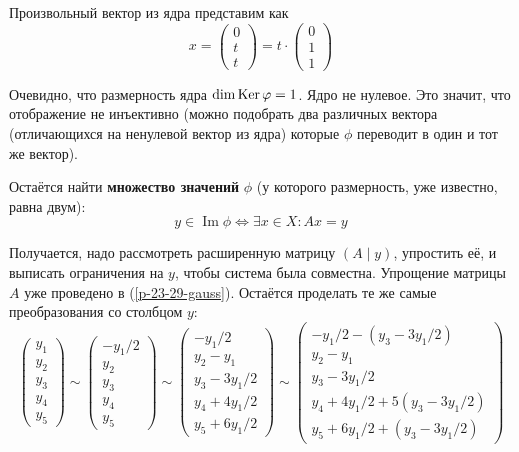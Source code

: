 \documentclass[a4paper,12pt]{article}
\DeclareMathOperator{\Imag}{Im}
\begin{document}
\begin{solution}
    Произвольный вектор из ядра представим как
    \[
      x = \begin{pmatrix}
        0 \\ t \\ t
      \end{pmatrix} = t \cdot \begin{pmatrix}
        0 \\ 1 \\ 1
      \end{pmatrix}
    \]
    
    Очевидно, что размерность ядра $\dim\Ker\phi \hm= 1$.
    Ядро не нулевое.
    Это значит, что отображение не инъективно (можно подобрать два различных вектора (отличающихся на ненулевой вектор из ядра) которые $\phi$ переводит в один и тот же вектор).
    
    \medskip
    
    Остаётся найти \textbf{множество значений} $\phi$ (у которого размерность, уже известно, равна двум):
    \[
      y \in \Imag\phi \Leftrightarrow \exists x \in X: Ax = y
    \]
    
    Получается, надо рассмотреть расширенную матрицу $(A \mid y)$, упростить её, и выписать ограничения на $y$, чтобы система была совместна.
    Упрощение матрицы $A$ уже проведено в (\ref{p-23-29-gauss}).
    Остаётся проделать те же самые преобразования со столбцом $y$:
    \[
      \begin{pmatrix}
        y_1 \\ y_2 \\ y_3 \\ y_4 \\ y_5
      \end{pmatrix}
      \sim \begin{pmatrix}
        -y_1/2 \\ y_2 \\ y_3 \\ y_4 \\ y_5
      \end{pmatrix}
      \sim \begin{pmatrix}
        -y_1/2 \\ y_2 - y_1 \\ y_3 - 3y_1/2 \\ y_4 + 4y_1/2 \\ y_5 + 6y_1/2
      \end{pmatrix}
      \sim \begin{pmatrix}
        -y_1/2 - \left(y_3 - 3y_1/2\right) \\ y_2 - y_1 \\ y_3 - 3y_1/2 \\ y_4 + 4y_1/2 + 5 \left(y_3 - 3y_1/2\right) \\ y_5 + 6y_1/2 + \left(y_3 - 3y_1/2\right)
      \end{pmatrix}
    \]
    

\end{solution}
\end{document}
